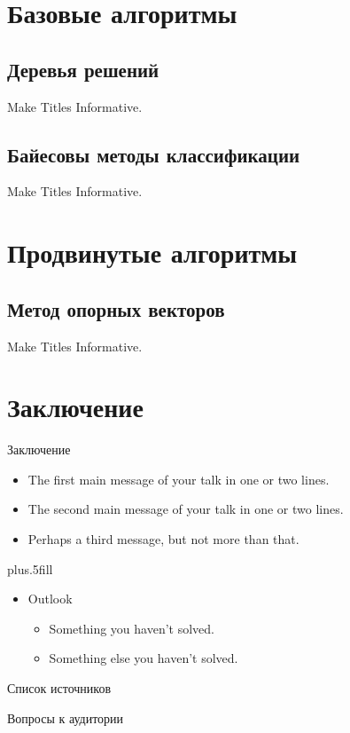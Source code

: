 \documentclass{beamer}
\begin{document}
\section{Базовые алгоритмы}
\subsection{Деревья решений}

\begin{frame}{Make Titles Informative.}
\end{frame}


\subsection{Байесовы методы классификации}

\begin{frame}{Make Titles Informative.}
\end{frame}

\section{Продвинутые алгоритмы}
\subsection{Метод опорных векторов}

\begin{frame}{Make Titles Informative.}
\end{frame}

\section{Заключение}

\begin{frame}{Заключение}

  \begin{itemize}
    \item
      The \alert{first main message} of your talk in one or two lines.
    \item
      The \alert{second main message} of your talk in one or two lines.
    \item
      Perhaps a \alert{third message}, but not more than that.
  \end{itemize}

  \vskip0pt plus.5fill
  \begin{itemize}
    \item
      Outlook
      \begin{itemize}
        \item
          Something you haven't solved.
        \item
          Something else you haven't solved.
      \end{itemize}
  \end{itemize}
\end{frame}

\begin{frame}[allowframebreaks]{Список источников} 
  \nocite{*}
  \printbibliography
\end{frame}

\begin{frame}{Вопросы к аудитории} 

\end{frame}

\begin{frame}
  \titlepage
\end{frame}
\end{document}
